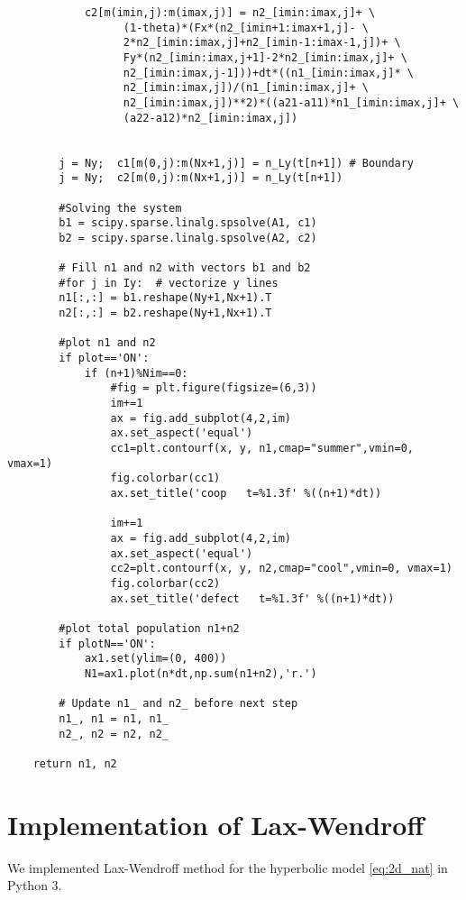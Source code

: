 \begin{lstlisting}
            c2[m(imin,j):m(imax,j)] = n2_[imin:imax,j]+ \
                  (1-theta)*(Fx*(n2_[imin+1:imax+1,j]- \
                  2*n2_[imin:imax,j]+n2_[imin-1:imax-1,j])+ \
                  Fy*(n2_[imin:imax,j+1]-2*n2_[imin:imax,j]+ \
                  n2_[imin:imax,j-1]))+dt*((n1_[imin:imax,j]* \
                  n2_[imin:imax,j])/(n1_[imin:imax,j]+ \
                  n2_[imin:imax,j])**2)*((a21-a11)*n1_[imin:imax,j]+ \
                  (a22-a12)*n2_[imin:imax,j])
            
            
        j = Ny;  c1[m(0,j):m(Nx+1,j)] = n_Ly(t[n+1]) # Boundary
        j = Ny;  c2[m(0,j):m(Nx+1,j)] = n_Ly(t[n+1])

        #Solving the system
        b1 = scipy.sparse.linalg.spsolve(A1, c1)
        b2 = scipy.sparse.linalg.spsolve(A2, c2)
        
        # Fill n1 and n2 with vectors b1 and b2
        #for j in Iy:  # vectorize y lines
        n1[:,:] = b1.reshape(Ny+1,Nx+1).T
        n2[:,:] = b2.reshape(Ny+1,Nx+1).T

        #plot n1 and n2    
        if plot=='ON':
            if (n+1)%Nim==0:
                #fig = plt.figure(figsize=(6,3))
                im+=1
                ax = fig.add_subplot(4,2,im)
                ax.set_aspect('equal')
                cc1=plt.contourf(x, y, n1,cmap="summer",vmin=0, vmax=1)
                fig.colorbar(cc1)
                ax.set_title('coop   t=%1.3f' %((n+1)*dt))

                im+=1
                ax = fig.add_subplot(4,2,im)
                ax.set_aspect('equal')
                cc2=plt.contourf(x, y, n2,cmap="cool",vmin=0, vmax=1)
                fig.colorbar(cc2)
                ax.set_title('defect   t=%1.3f' %((n+1)*dt))
                
        #plot total population n1+n2
        if plotN=='ON':
            ax1.set(ylim=(0, 400))
            N1=ax1.plot(n*dt,np.sum(n1+n2),'r.')    
            
        # Update n1_ and n2_ before next step
        n1_, n1 = n1, n1_
        n2_, n2 = n2, n2_
    
    return n1, n2
\end{lstlisting}


\section*{Implementation of Lax-Wendroff}

We implemented Lax-Wendroff method for the hyperbolic model \ref{eq:2d_nat}
in Python 3. 

